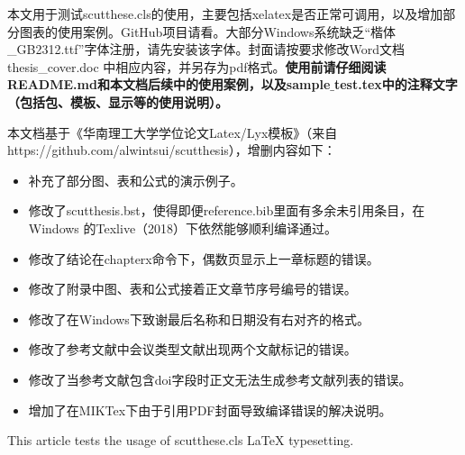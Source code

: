 \documentclass[unicode,pdfcover]{scutthesis}
\begin{document}
\maketitle

\frontmatter

\begin{abstractCN}
本文用于测试scutthese.cls的使用，主要包括xelatex是否正常可调用，以及增加部分图表的使用案例。GitHub项目请看\cite{2020Scutthesis}。大部分Windows系统缺乏“楷体\_GB2312.ttf”字体注册，请先安装该字体。封面请按要求修改Word文档 thesis\_cover.doc 中相应内容，并另存为pdf格式。\textbf{使用前请仔细阅读README.md和本文档后续中的使用案例，以及sample$\_$test.tex中的注释文字（包括包、模板、显示等的使用说明）。}

本文档基于《华南理工大学学位论文Latex/Lyx模板》\cite{2016Scutthesis}（来自https://github.com/alwintsui/scutthesis），增删内容如下：
\begin{itemize}
  \item 补充了部分图、表和公式的演示例子。
  \item 修改了scutthesis.bst，使得即便reference.bib里面有多余未引用条目，在Windows 的Texlive（2018）下依然能够顺利编译通过。
  \item 修改了结论在chapterx命令下，偶数页显示上一章标题的错误。
  \item 修改了附录中图、表和公式接着正文章节序号编号的错误。
  \item 修改了在Windows下致谢最后名称和日期没有右对齐的格式。
  \item 修改了参考文献中会议类型文献出现两个文献标记的错误。
  \item 修改了当参考文献包含doi字段时正文无法生成参考文献列表的错误。
  \item 增加了在MIKTex下由于引用PDF封面导致编译错误的解决说明。
\end{itemize}


\end{abstractCN}

\begin{abstractEN}
This article tests the usage of scutthese.cls \LaTeX{} typesetting.
\end{abstractEN}


\tableofcontents{}%

\end{document}
